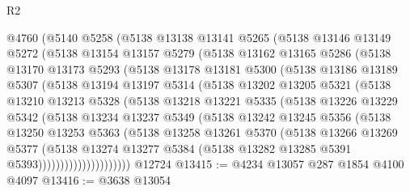 \begin{lexlean}{R2}
\begin{coremodule}
    @4760
      (@5140
        @5258
        (@5138
          @13138
          @13141
          @5265
          (@5138
            @13146
            @13149
            @5272
            (@5138
              @13154
              @13157
              @5279
              (@5138
                @13162
                @13165
                @5286
                (@5138
                  @13170
                  @13173
                  @5293
                  (@5138
                    @13178
                    @13181
                    @5300
                    (@5138
                      @13186
                      @13189
                      @5307
                      (@5138
                        @13194
                        @13197
                        @5314
                        (@5138
                          @13202
                          @13205
                          @5321
                          (@5138
                            @13210
                            @13213
                            @5328
                            (@5138
                              @13218
                              @13221
                              @5335
                              (@5138
                                @13226
                                @13229
                                @5342
                                (@5138
                                  @13234
                                  @13237
                                  @5349
                                  (@5138
                                    @13242
                                    @13245
                                    @5356
                                    (@5138
                                      @13250
                                      @13253
                                      @5363
                                      (@5138
                                        @13258
                                        @13261
                                        @5370
                                        (@5138
                                          @13266
                                          @13269
                                          @5377
                                          (@5138
                                            @13274
                                            @13277
                                            @5384
                                            (@5138 @13282 @13285 @5391 @5393)))))))))))))))))))))
    @12724
@13415 := @4234 @13057 @287 @1854 @4100 @4097
@13416 := @3638 @13054

\end{coremodule}
\end{lexlean}
